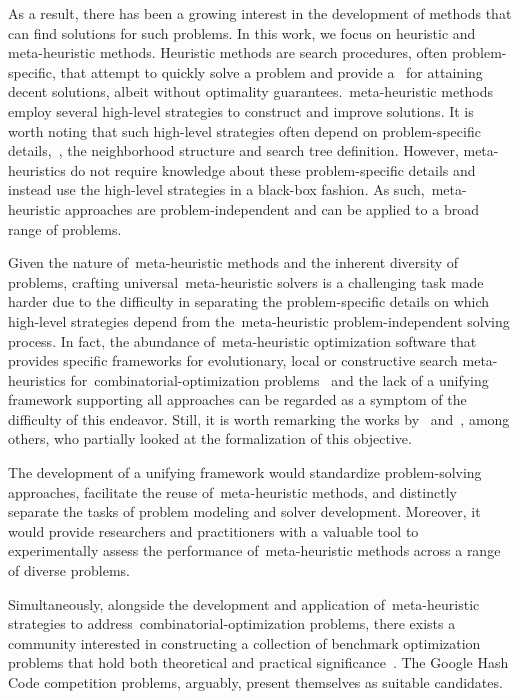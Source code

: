 As a result, there has been a growing interest in the development of methods
that can find  solutions for such problems. In this work, we
focus on heuristic and meta-heuristic methods. Heuristic methods are search
procedures, often problem-specific, that attempt to quickly solve a problem and
provide a~ for attaining decent solutions, albeit
without optimality guarantees.~\acrfull{meta-heuristic} methods employ several
high-level strategies to construct and improve solutions. It is worth noting
that such high-level strategies often depend on problem-specific details,~\eg{},
the neighborhood structure and search tree definition. However, meta-heuristics
do not require knowledge about these problem-specific details and instead use
the high-level strategies in a black-box fashion. As
such,~\acrshort{meta-heuristic} approaches are problem-independent and can be
applied to a broad range of problems.

Given the nature of~\acrshort{meta-heuristic} methods and the inherent diversity
of problems, crafting universal~\acrshort{meta-heuristic} solvers is a
challenging task made harder due to the difficulty in separating the
problem-specific details on which high-level strategies depend from
the~\acrshort{meta-heuristic} problem-independent solving process. In fact, the
abundance of~\acrshort{meta-heuristic} optimization software that provides
specific frameworks for evolutionary, local or constructive search
meta-heuristics for~\acrshort{combinatorial-optimization}
problems~\cite{cahon2004paradiseoa,digaspero2003easylocal,durillo2011jmetal} and
the lack of a unifying framework supporting all approaches can be regarded as a
symptom of the difficulty of this endeavor. Still, it is worth remarking the
works by~\citet{vieira2009uma} and~\citet{outeiro2021application}, among others,
who partially looked at the formalization of this objective.

The development of a unifying framework would standardize problem-solving
approaches, facilitate the reuse of~\acrshort{meta-heuristic} methods, and
distinctly separate the tasks of problem modeling and solver development.
Moreover, it would provide researchers and practitioners with a valuable tool to
experimentally assess the performance of~\acrshort{meta-heuristic} methods
across a range of diverse problems.

Simultaneously, alongside the development and application
of~\acrshort{meta-heuristic} strategies to
address~\acrshort{combinatorial-optimization} problems, there exists a community
interested in constructing a collection of benchmark optimization problems that
hold both theoretical and practical
significance~\cite{bartz-beielstein2020benchmarking}. The Google Hash Code
competition problems, arguably, present themselves as suitable candidates.

